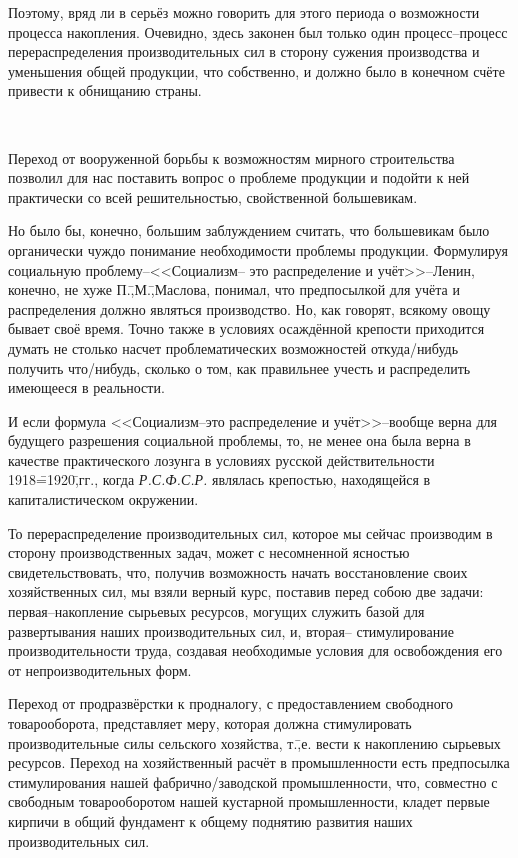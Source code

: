 Поэтому, вряд ли в серьёз можно говорить для этого периода о возможности процесса накопления. Очевидно, здесь законен был только один процесс\---процесс перераспределения производительных сил в сторону сужения производства и уменьшения общей продукции, что собственно, и должно было в конечном счёте привести к обнищанию страны.

\begin{center}
 \noindent\textasteriskcentered\ \textasteriskcentered\ \textasteriskcentered
\end{center}

Переход от вооруженной борьбы к возможностям мирного строительства позволил для нас поставить вопрос о проблеме продукции и подойти к ней практически со всей решительностью, свойственной большевикам.

Но было бы, конечно, большим заблуждением считать, что большевикам было органически чуждо понимание необходимости проблемы продукции. Формулируя социальную проблему\---<<Социализм\--- это распределение и учёт>>\---Ленин, конечно, не хуже П.\=,М.\=,Маслова, понимал, что предпосылкой для учёта и распределения должно являться производство. Но, как говорят, всякому овощу бывает своё время. Точно также в условиях осаждённой крепости приходится думать не столько насчет проблематических возможностей откуда\-/нибудь получить что\-/нибудь, сколько о том, как правильнее учесть и распределить имеющееся в реальности.

И если формула <<Социализм\---это распределение и учёт>>\---вообще верна для будущего разрешения социальной проблемы, то, не менее она была верна в качестве практического лозунга в условиях русской действительности 1918\==1920\=,гг., когда \emph{Р.С.Ф.С.Р.} являлась крепостью, находящейся в капиталистическом окружении.

То перераспределение производительных сил, которое мы сейчас производим в сторону производственных задач, может с несомненной ясностью свидетельствовать, что, получив возможность начать восстановление своих хозяйственных сил, мы взяли верный курс, поставив перед собою две задачи: первая\---накопление сырьевых ресурсов, могущих служить базой для развертывания наших производительных сил, и, вторая\--- стимулирование производительности труда, создавая необходимые условия для освобождения его от непроизводительных форм.

Переход от продразвёрстки к продналогу, с предоставлением свободного товарооборота, представляет меру, которая должна стимулировать производительные силы сельского хозяйства, т.\=,е. вести к накоплению сырьевых ресурсов. Переход на хозяйственный расчёт в промышленности есть предпосылка стимулирования нашей фабрично\-/заводской промышленности, что, совместно с свободным товарооборотом нашей кустарной промышленности, кладет первые кирпичи в общий фундамент к общему поднятию развития наших производительных сил.

